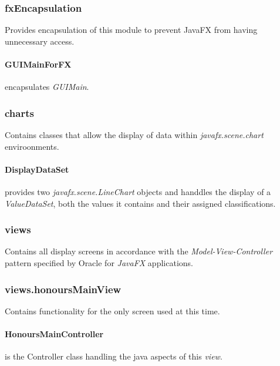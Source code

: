 \documentclass[main.tex]{subfiles}
\begin{document}
      \subsubsection*{fxEncapsulation}
        
        Provides encapsulation of this module to prevent JavaFX from having unnecessary access.
        
        \paragraph{GUIMainForFX} encapsulates \textit{GUIMain}.
        
      \subsubsection*{charts}
        
        Contains classes that allow the display of data within \textit{javafx.scene.chart} enviroonments.
        
        \paragraph{DisplayDataSet} provides two \textit{javafx.scene.LineChart} objects and handdles the display of a \textit{ValueDataSet}, both the values it contains and their assigned classifications.
        
      \subsubsection*{views}
        
        Contains all display screens in accordance with the \textit{Model-View-Controller} pattern specified by Oracle for \textit{JavaFX} applications.
        
      \subsubsection*{views.honoursMainView}  
        
        Contains functionality for the only screen used at this time.
        
        \paragraph{HonoursMainController} is the Controller class handling the java aspects of this \textit{view}.
      
      
\end{document}
